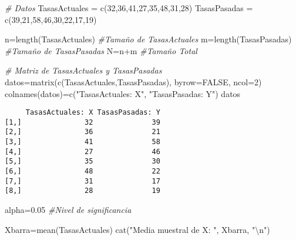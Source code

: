 \documentclass[
  a4paper,
  oneside,
  openany]{book}
\newenvironment{Shaded}{\begin{snugshade}}{\end{snugshade}}
\newcommand{\AttributeTok}[1]{\textcolor[rgb]{0.77,0.63,0.00}{#1}}
\newcommand{\CommentTok}[1]{\textcolor[rgb]{0.56,0.35,0.01}{\textit{#1}}}
\newcommand{\ConstantTok}[1]{\textcolor[rgb]{0.00,0.00,0.00}{#1}}
\newcommand{\DecValTok}[1]{\textcolor[rgb]{0.00,0.00,0.81}{#1}}
\newcommand{\FloatTok}[1]{\textcolor[rgb]{0.00,0.00,0.81}{#1}}
\newcommand{\FunctionTok}[1]{\textcolor[rgb]{0.00,0.00,0.00}{#1}}
\newcommand{\NormalTok}[1]{#1}
\newcommand{\OtherTok}[1]{\textcolor[rgb]{0.56,0.35,0.01}{#1}}
\newcommand{\SpecialCharTok}[1]{\textcolor[rgb]{0.00,0.00,0.00}{#1}}
\newcommand{\StringTok}[1]{\textcolor[rgb]{0.31,0.60,0.02}{#1}}
\begin{document}
\begin{Shaded}
\begin{Highlighting}[]
\CommentTok{\# Datos}
\NormalTok{TasasActuales }\OtherTok{=} \FunctionTok{c}\NormalTok{(}\DecValTok{32}\NormalTok{,}\DecValTok{36}\NormalTok{,}\DecValTok{41}\NormalTok{,}\DecValTok{27}\NormalTok{,}\DecValTok{35}\NormalTok{,}\DecValTok{48}\NormalTok{,}\DecValTok{31}\NormalTok{,}\DecValTok{28}\NormalTok{)}
\NormalTok{TasasPasadas }\OtherTok{=} \FunctionTok{c}\NormalTok{(}\DecValTok{39}\NormalTok{,}\DecValTok{21}\NormalTok{,}\DecValTok{58}\NormalTok{,}\DecValTok{46}\NormalTok{,}\DecValTok{30}\NormalTok{,}\DecValTok{22}\NormalTok{,}\DecValTok{17}\NormalTok{,}\DecValTok{19}\NormalTok{)}

\NormalTok{n}\OtherTok{=}\FunctionTok{length}\NormalTok{(TasasActuales)  }\CommentTok{\#Tamaño de TasasActuales}
\NormalTok{m}\OtherTok{=}\FunctionTok{length}\NormalTok{(TasasPasadas)   }\CommentTok{\#Tamaño de TasasPasadas}
\NormalTok{N}\OtherTok{=}\NormalTok{n}\SpecialCharTok{+}\NormalTok{m                    }\CommentTok{\#Tamaño Total}

\CommentTok{\# Matriz de TasasActuales y TasasPasadas}
\NormalTok{datos}\OtherTok{=}\FunctionTok{matrix}\NormalTok{(}\FunctionTok{c}\NormalTok{(TasasActuales,TasasPasadas), }\AttributeTok{byrow=}\ConstantTok{FALSE}\NormalTok{, }\AttributeTok{ncol=}\DecValTok{2}\NormalTok{)}
\FunctionTok{colnames}\NormalTok{(datos)}\OtherTok{=}\FunctionTok{c}\NormalTok{(}\StringTok{"TasasActuales: X"}\NormalTok{, }\StringTok{"TasasPasadas: Y"}\NormalTok{)}
\NormalTok{datos}
\end{Highlighting}
\end{Shaded}

\begin{verbatim}
     TasasActuales: X TasasPasadas: Y
[1,]               32              39
[2,]               36              21
[3,]               41              58
[4,]               27              46
[5,]               35              30
[6,]               48              22
[7,]               31              17
[8,]               28              19
\end{verbatim}

\begin{Shaded}
\begin{Highlighting}[]
\NormalTok{alpha}\OtherTok{=}\FloatTok{0.05}  \CommentTok{\#Nivel de significancia }

\NormalTok{Xbarra}\OtherTok{=}\FunctionTok{mean}\NormalTok{(TasasActuales)}
\FunctionTok{cat}\NormalTok{(}\StringTok{"Media muestral de X: "}\NormalTok{, Xbarra, }\StringTok{"}\SpecialCharTok{\textbackslash{}n}\StringTok{"}\NormalTok{)}
\end{Highlighting}
\end{Shaded}
\end{document}
